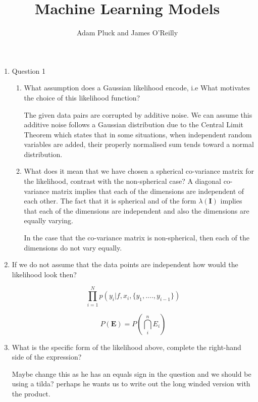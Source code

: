 \documentclass[13pt]{article}
\title{\vspace{-2.0cm}Machine Learning Models\vspace{-2ex}}
\author{\vspace{-5.0cm}Adam Pluck and James O'Reilly\vspace{-3ex}}
\date{\vspace{-2ex}}
\begin{document}
\maketitle

\begin{enumerate}

\item {\Large Question 1}

\begin{enumerate}


  \item {\large What assumption does a Gaussian likelihood encode, i.e What motivates the choice of this likelihood function?}
  
  The given data pairs are corrupted by additive noise. We can assume this additive noise follows a Gaussian distribution due to the Central Limit Theorem which states that in some situations, when independent random variables are added, their properly normalised sum tends toward a normal distribution.
  
  \item {\large What does it mean that we have chosen a spherical co-variance matrix for the likelihood, contrast with the non-spherical case?}
  A diagonal co-variance matrix implies that each of the dimensions are independent of each other. The fact that it is spherical and of the form $\lambda(\mathbf{I})$ implies that each of the dimensions are independent and also the dimensions are equally varying.
  
  In the case that the co-variance matrix is non-spherical, then each of the dimensions do not vary equally.
 \end{enumerate}
 
  \item {\large If we do not assume that the data points are independent how would the likelihood look then?}
  
   $$\prod_{i = 1}^{N} p\left( y_i | f, x_i, \{y_1, ...., y_{i-1}\} \right) $$
     
  \begin{equation}
      P(\mathbf{E}) = P\left (  \bigcap_{i}^{n} E_{i}    \right )
  \end{equation}
  
  \item {\large What is the specific form of the likelihood above, complete the right-hand side of the expression? \par}
  Maybe change this as he has an equals sign in the question and we should be using a tilda? perhaps he wants us to write out the long winded version with the product.
  

\end{enumerate}
\end{document}
